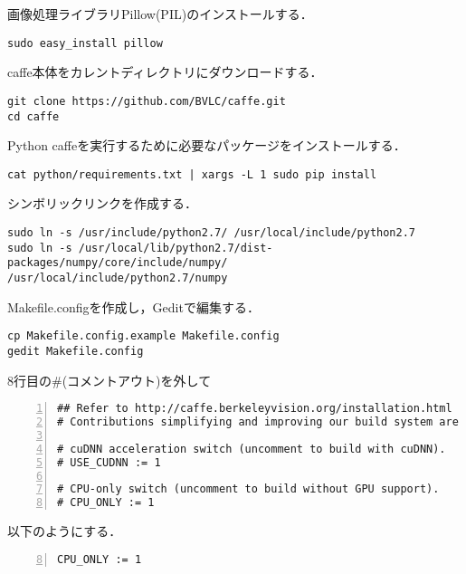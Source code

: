 \documentclass[a4paper,10pt]{jsarticle}
\begin{document}
画像処理ライブラリPillow(PIL)のインストールする．
\begin{lstlisting}[basicstyle=\ttfamily\footnotesize, frame=single]
sudo easy_install pillow
\end{lstlisting}

caffe本体をカレントディレクトリにダウンロードする．
\begin{lstlisting}[basicstyle=\ttfamily\footnotesize, frame=single]
git clone https://github.com/BVLC/caffe.git
cd caffe
\end{lstlisting}

Python caffeを実行するために必要なパッケージをインストールする．
\begin{lstlisting}[basicstyle=\ttfamily\footnotesize, frame=single]
cat python/requirements.txt | xargs -L 1 sudo pip install
\end{lstlisting}

シンボリックリンクを作成する．
\begin{lstlisting}[basicstyle=\ttfamily\footnotesize, frame=single]
sudo ln -s /usr/include/python2.7/ /usr/local/include/python2.7
sudo ln -s /usr/local/lib/python2.7/dist-packages/numpy/core/include/numpy/
/usr/local/include/python2.7/numpy
\end{lstlisting}

Makefile.configを作成し，Geditで編集する．
\begin{lstlisting}[basicstyle=\ttfamily\footnotesize, frame=single]
cp Makefile.config.example Makefile.config
gedit Makefile.config
\end{lstlisting}

8行目の\#(コメントアウト)を外して
\begin{lstlisting}[basicstyle=\ttfamily\footnotesize, frame=single, numbers=left]
## Refer to http://caffe.berkeleyvision.org/installation.html
# Contributions simplifying and improving our build system are welcome!

# cuDNN acceleration switch (uncomment to build with cuDNN).
# USE_CUDNN := 1

# CPU-only switch (uncomment to build without GPU support).
# CPU_ONLY := 1
\end{lstlisting}

以下のようにする．
\begin{lstlisting}[basicstyle=\ttfamily\footnotesize, frame=single,  firstnumber=8, numbers=left]
CPU_ONLY := 1
\end{lstlisting}
\end{document}

